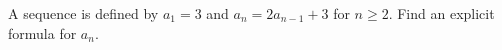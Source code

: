 A sequence is defined by $a_1=3$ and $a_n=2a_{n-1}+3$ for $n\ge2$. Find an explicit formula for $a_n$.
